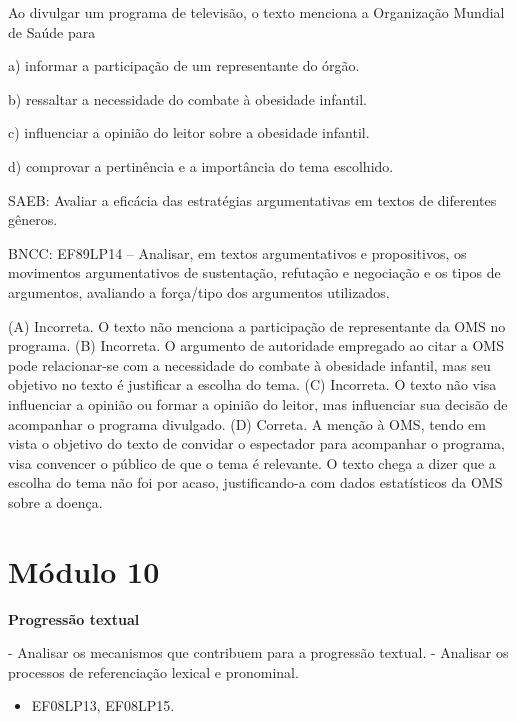 
Ao divulgar um programa de televisão, o texto menciona a Organização
Mundial de Saúde para

a) informar a participação de um representante do órgão.

b) ressaltar a necessidade do combate à obesidade infantil.

c) influenciar a opinião do leitor sobre a obesidade infantil.

d) comprovar a pertinência e a importância do tema escolhido.

SAEB: Avaliar a eficácia das estratégias argumentativas em textos de
diferentes gêneros.

BNCC: EF89LP14 -- Analisar, em textos argumentativos e propositivos, os
movimentos argumentativos de sustentação, refutação e negociação e os
tipos de argumentos, avaliando a força/tipo dos argumentos utilizados.

(A) Incorreta. O texto não menciona a participação de representante da
OMS no programa. (B) Incorreta. O argumento de autoridade empregado ao
citar a OMS pode relacionar-se com a necessidade do combate à obesidade
infantil, mas seu objetivo no texto é justificar a escolha do tema. (C)
Incorreta. O texto não visa influenciar a opinião ou formar a opinião do
leitor, mas influenciar sua decisão de acompanhar o programa divulgado.
(D) Correta. A menção à OMS, tendo em vista o objetivo do texto de
convidar o espectador para acompanhar o programa, visa convencer o
público de que o tema é relevante. O texto chega a dizer que a escolha
do tema não foi por acaso, justificando-a com dados estatísticos da OMS
sobre a doença.


\section{Módulo 10}

\textbf{Progressão textual}

 - Analisar os mecanismos que contribuem
para a progressão textual. - Analisar os processos de referenciação
lexical e pronominal.


\begin{itemize}
\tightlist
\item
  EF08LP13, EF08LP15.
\end{itemize}

